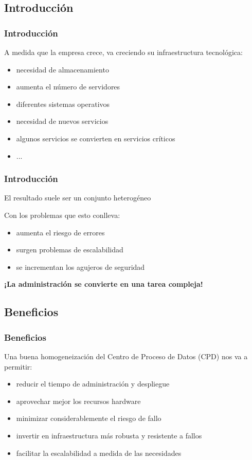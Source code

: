 \documentclass{beamer}
\begin{document}
\subsection{Introducción}
\begin{frame}
  \frametitle{Introducción}
  A medida que la empresa crece, va creciendo su infraestructura tecnológica:
  \begin{itemize}
    \item necesidad de almacenamiento
    \item aumenta el número de servidores
    \item diferentes sistemas operativos
    \item necesidad de nuevos servicios
    \item algunos servicios se convierten en servicios críticos
    \item ...
  \end{itemize}
\end{frame}

\begin{frame}
  \frametitle{Introducción}
  
  \begin{center}
    \alert{El resultado suele ser un conjunto heterogéneo}
  \end{center}
  \pause
  Con los problemas que esto conlleva:
  \begin{itemize}
    \item aumenta el riesgo de errores
    \item surgen problemas de escalabilidad
    \item se incrementan los agujeros de seguridad
  \end{itemize}
  \pause
  \begin{center}
    \textbf{¡La administración se convierte en una tarea compleja!}
  \end{center}
\end{frame}

\subsection{Beneficios}
\begin{frame}
  \frametitle{Beneficios}
  Una buena homogeneización del Centro de Proceso de Datos (CPD) nos va a permitir:
  \begin{itemize}
    \item reducir el tiempo de administración y despliegue
    \item aprovechar mejor los recursos hardware
    \item minimizar considerablemente el riesgo de fallo
    \item invertir en infraestructura más robusta y resistente a fallos
    \item facilitar la escalabilidad a medida de las necesidades
  \end{itemize} 
\end{frame}
\end{document}
